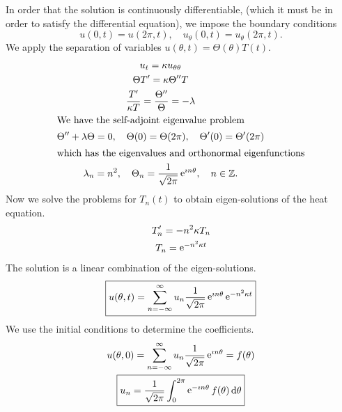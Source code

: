 {%
\begin{Solution}
  \label{solution Heat equation on a ring}
  In order that the solution is continuously differentiable, 
  (which it must be in order to satisfy the differential equation),
  we impose the boundary conditions
  \[
  u(0,t) = u(2 \pi,t), \quad
  u_\theta(0,t) = u_\theta(2 \pi,t).
  \]
  We apply the separation of variables 
  $u(\theta,t) = \Theta(\theta) T(t)$.
  \begin{gather*}
    u_t = \kappa u_{\theta\theta} \\
    \Theta T' = \kappa \Theta'' T \\
    \frac{ T' }{ \kappa T } = \frac{ \Theta'' }{ \Theta } = - \lambda \\
    \intertext{We have the self-adjoint eigenvalue problem}
    \Theta'' + \lambda \Theta = 0, \quad 
    \Theta(0) = \Theta(2 \pi), \quad
    \Theta'(0) = \Theta'(2 \pi) \\
    \intertext{which has the eigenvalues and orthonormal eigenfunctions}
    \lambda_n = n^2, \quad 
    \Theta_n = \frac{1}{\sqrt{2 \pi}} \mathop{\mathrm{e}}\nolimits^{\imath n \theta}, \quad
    n \in \mathbb{Z}.
  \end{gather*}
  Now we solve the problems for $T_n(t)$ to obtain eigen-solutions of the
  heat equation.
  \begin{gather*}
    T_n' = - n^2 \kappa T_n \\
    T_n = \mathop{\mathrm{e}}\nolimits^{-n^2 \kappa t}
  \end{gather*}
  The solution is a linear combination of the eigen-solutions.
  \[
  \boxed{
    u(\theta,t) = \sum_{n = -\infty}^\infty u_n \frac{1}{\sqrt{2 \pi}} \mathop{\mathrm{e}}\nolimits^{\imath n \theta}
    \mathop{\mathrm{e}}\nolimits^{-n^2 \kappa t}
    }
  \]
  We use the initial conditions to determine the coefficients.
  \begin{gather*}
    u(\theta,0) = \sum_{n = -\infty}^\infty u_n \frac{1}{\sqrt{2 \pi}} \mathop{\mathrm{e}}\nolimits^{\imath n \theta}
    = f(\theta) \\
    \boxed{
      u_n = \frac{1}{\sqrt{2 \pi}} \int_0^{2 \pi} \mathop{\mathrm{e}}\nolimits^{-\imath n \theta}
      f(\theta) \,\mathrm{d} \theta
      }
  \end{gather*}
\end{Solution}






}
